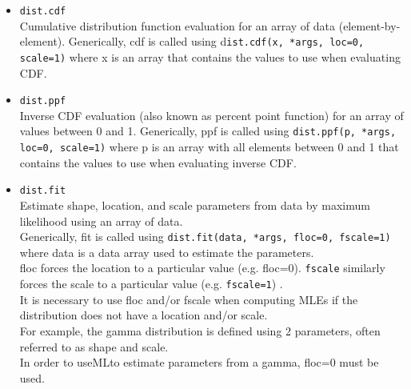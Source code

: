\documentclass[MASTER.tex]{subfiles}
\begin{document}
\begin{frame}
	\begin{itemize}
		\item \texttt{dist.cdf}\\
		Cumulative distribution function evaluation for an array of data (element-by-element). Generically, cdf
		is called using d\texttt{ist.cdf(x, *args, loc=0, scale=1)} where x is an array that contains the values to use
		when evaluating CDF.
		\item \texttt{dist.ppf}\\
		Inverse CDF evaluation (also known as percent point function) for an array of values between 0 and 1.
		Generically, ppf is called using \texttt{dist.ppf(p, *args, loc=0, scale=1)} where p is an array with all elements
		between 0 and 1 that contains the values to use when evaluating inverse CDF.
	\end{itemize}
\end{frame}
\begin{frame}
	\begin{itemize}
		\item \texttt{dist.fit}\\
		Estimate shape, location, and scale parameters from data by maximum likelihood using an array of data.
		\\ Generically, fit is called using \texttt{dist.fit(data, *args, floc=0, fscale=1)} where data is a data array used
		to estimate the parameters. \\ floc forces the location to a particular value (e.g. floc=0). \texttt{fscale} similarly
		forces the scale to a particular value (e.g. \texttt{fscale=1}) .\\  It is necessary to use floc and/or fscale when
		computing MLEs if the distribution does not have a location and/or scale.\\ For example, the gamma distribution
		is defined using 2 parameters, often referred to as shape and scale. \\ In order to useMLto estimate
		parameters from a gamma, floc=0 must be used.
	\end{itemize}
\end{frame}
\end{document}
